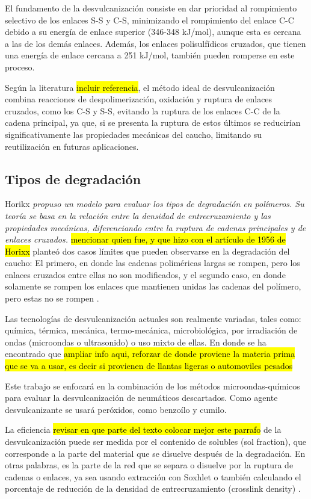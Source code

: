 \begin{multicols}{2}
El fundamento de la desvulcanización consiste en dar prioridad al rompimiento selectivo de los enlaces S-S y C-S, minimizando el rompimiento del enlace C-C debido a su energía de enlace superior (346-348 kJ/mol), aunque esta es cercana a las de los demás enlaces. Además, los enlaces  polisulfídicos cruzados, que tienen una energía de enlace cercana a 251 kJ/mol, también pueden romperse en este proceso.

Según la literatura \hl{incluir referencia}, el método ideal de desvulcanización combina reacciones de despolimerización, oxidación y ruptura de enlaces cruzados, como los C-S y S-S, evitando la ruptura de los enlaces C-C de la cadena principal, ya que, si se presenta la ruptura de estos últimos se reducirían significativamente las propiedades mecánicas del caucho, limitando su reutilización en futuras aplicaciones.


\subsection{\textbf{\large{Tipos de degradación}}}

Horikx \textit{propuso un modelo para evaluar los tipos de degradación en polímeros. Su teoría se basa en la relación entre la densidad de entrecruzamiento y las propiedades mecánicas, diferenciando entre la ruptura de cadenas principales y de enlaces cruzados.} \hl{mencionar quien fue, y que hizo con el artículo de 1956 de Horixx} planteó dos casos límites que pueden observarse en la degradación del caucho: El primero, en donde las cadenas poliméricas largas se rompen, pero los enlaces cruzados entre ellas no son modificados, y el segundo caso, en donde solamente se rompen los enlaces que mantienen unidas las cadenas del polímero, pero estas no se rompen \cite{Sabzekar2015} \cite{Horikx1956}.

Las tecnologías de desvulcanización actuales son realmente variadas, tales como: química, térmica, mecánica, termo-mecánica, microbiológica, por irradiación de ondas (microondas o ultrasonido) o uso mixto de ellas. En donde se ha encontrado que \hl{ampliar info aqui, reforzar de donde proviene la materia prima que se va a usar, es decir si provienen de llantas ligeras o automoviles pesados}

Este trabajo se enfocará en la combinación de los métodos microondas-químicos para evaluar la desvulcanización de neumáticos descartados. Como agente desvulcanizante se usará peróxidos, como benzoílo y cumilo.

La eficiencia \hl{revisar en que parte del texto colocar mejor este parrafo} de la desvulcanización puede ser medida por el contenido de solubles (sol fraction), que corresponde a la parte del material que se disuelve después de la degradación. En otras palabras, es la parte de la red que se separa o disuelve por la ruptura de cadenas o enlaces, ya sea usando extracción con Soxhlet o también calculando el porcentaje de reducción de la densidad de entrecruzamiento (crosslink density) \cite{Xiao2022}.


\end{multicols}
